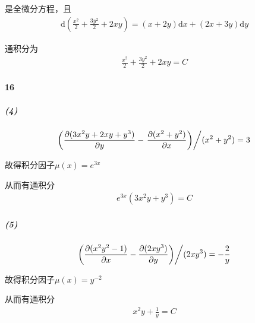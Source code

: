 \documentclass[UTF8]{ctexart}
\begin{document}
    是全微分方程，且
    \begin{align*}
        \mathrm{d}(\frac{x^2}{2} + \frac{3y^2}{2} + 2xy) = (x+2y)\mathrm{d}x + (2x+3y)\mathrm{d}y
    \end{align*}

    通积分为
    \begin{align*}
        \frac{x^2}{2} + \frac{3y^2}{2} + 2xy = C
    \end{align*}

    \paragraph*{16}
    \subparagraph*{(4)}
    \begin{align*}
        \left(\frac{\partial (3x^2y+2xy+y^3)}{\partial y} - 
        \left. \frac{\partial (x^2+y^2)}{\partial x} \right)\middle/ (x^2+y^2) = 3 \right.
    \end{align*}
    
    故得积分因子$\mu (x) = e^{3x}$

    从而有通积分
    \begin{align*}
        e^{3x}(3x^2y+y^3) = C
    \end{align*}

    \subparagraph*{(5)}
    \begin{align*}
        \left. \left(\frac{\partial (x^2y^2-1)}{\partial x}
         - \frac{\partial (2xy^3)}{\partial y}\right)\middle/ (2xy^3)  = -\frac{2}{y} \right.
    \end{align*}

    故得积分因子$\mu (x) = y^{-2}$

    从而有通积分
    \begin{align*}
        x^2y +  \frac{1}{y} = C
    \end{align*}
\end{document}
